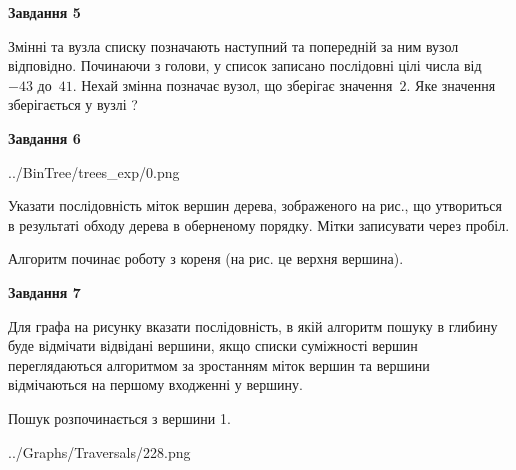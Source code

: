 \documentclass[12pt, ukrainian]{article}
\begin{document}
{\begin {large}
{\begin {center}\textbf{Завдання 5}\end {center}}\par
Змінні  та  вузла списку позначають наступний та попередній за ним вузол відповідно. Починаючи з голови, у список записано послідовні цілі числа від~$-43$ до~$41$. Нехай змінна  позначає вузол, що зберігає значення~$2$.
Яке значення зберігається у вузлі  ?\par
\newpage

{\begin {center}\textbf{Завдання 6}\end {center}}\par

\begin{center}
	{../BinTree/trees_exp/0.png}
\end{center}
Указати послідовність міток вершин дерева, зображеного на рис., що утвориться в результаті обходу дерева в оберненому порядку. Мітки записувати через пробіл.\par Алгоритм починає роботу з кореня (на рис. це верхня вершина).\par
\newpage

{\begin {center}\textbf{Завдання 7}\end {center}}\par
Для графа на рисунку вказати послідовність, в якій алгоритм пошуку в глибину буде відмічати відвідані вершини, якщо списки суміжності вершин переглядаються алгоритмом за зростанням міток вершин та вершини відмічаються на першому вход\-женні у вершину.\par
Пошук розпочинається з вершини 1.\par

\begin{center}
	{../Graphs/Traversals/228.png}
\end{center}\par
\newpage


\end{large}}
\end{document}
